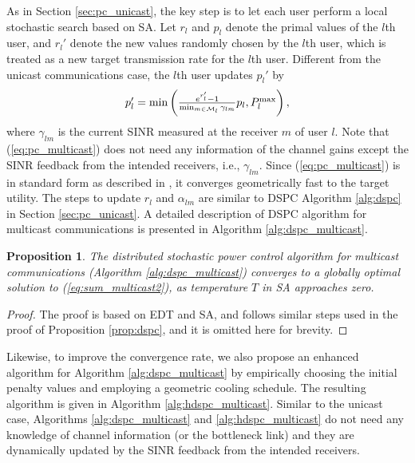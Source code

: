 \documentclass[10pt,journal,letterpaper,compsoc]{IEEEtran}
\newtheorem{prop}{\textbf{Proposition}}[section]
\begin{document}
{{As in Section \ref{sec:pc_unicast}, the key step is to let each user perform a local stochastic search based on SA. Let $r_l$ and $p_l$ denote the primal values of the $l$th user, and $r_l'$ denote the new values randomly chosen by the $l$th user, which is treated as a new target transmission rate for the $l$th user. Different from the unicast communications case, the $l$th user updates $p_l'$ by
\begin{equation}\begin{array}
[c]{lll}p_l'=\min\left(\frac{e^{r_l'}-1}{\min_{m\in\mathcal{M}_l}\gamma_{lm}}p_l,P_l^{\max}\right),
\end{array}
\label{eq:pc_multicast}
\end{equation}
where $\gamma_{lm}$ is the current SINR measured at the receiver $m$ of user $l$. Note that (\ref{eq:pc_multicast}) does not need any information of the channel gains except the SINR feedback from the intended receivers, i.e.,  $\gamma_{lm}$.  Since (\ref{eq:pc_multicast}) is in standard form as described in \cite{yates:1995}, it converges geometrically fast to the target utility. The steps to update $r_l$ and $\alpha_{lm}$ are similar to DSPC Algorithm \ref{alg:dspc} in Section \ref{sec:pc_unicast}. A detailed description of DSPC algorithm for multicast communications is presented in Algorithm \ref{alg:dspc_multicast}.

\begin{prop}
\label{prop:dspc_multicast}
The distributed stochastic power control algorithm for multicast communications (Algorithm \ref{alg:dspc_multicast}) converges to a globally optimal solution to (\ref{eq:sum_multicast2}), as temperature $T$ in SA approaches zero.
\end{prop}
\begin{proof}
The proof is based on EDT and SA, and follows similar steps used in the proof of Proposition \ref{prop:dspc}, and it is omitted here for brevity.
\end{proof}

Likewise, to improve the convergence rate, we also propose an enhanced algorithm for Algorithm \ref{alg:dspc_multicast} by empirically choosing the initial penalty values and employing a geometric cooling schedule. The resulting algorithm is given in Algorithm \ref{alg:hdspc_multicast}. Similar to the unicast case, Algorithms \ref{alg:dspc_multicast} and \ref{alg:hdspc_multicast} do not need any knowledge of channel information (or the bottleneck link) and they are dynamically updated by the SINR feedback from the intended receivers.

}}
\end{document}
